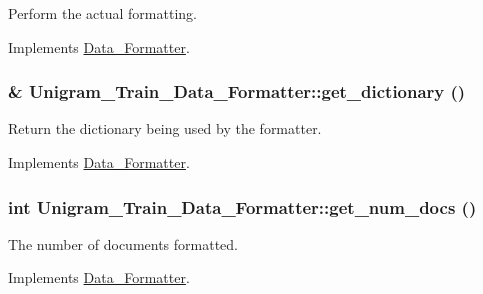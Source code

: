 Perform the actual formatting. 



Implements \hyperlink{class_data___formatter_a4180972aaff1249e0290c3544665403d}{Data\_\-Formatter}.

\hypertarget{class_unigram___train___data___formatter_ab406933ef119074cab682cb07c9078b4}{
\subsubsection[{get\_\-dictionary}]{ \& Unigram\_\-Train\_\-Data\_\-Formatter::get\_\-dictionary ()}}
\label{class_unigram___train___data___formatter_ab406933ef119074cab682cb07c9078b4}


Return the dictionary being used by the formatter. 



Implements \hyperlink{class_data___formatter_ad7371376f95eddd15fb197a729b28c50}{Data\_\-Formatter}.

\hypertarget{class_unigram___train___data___formatter_afbc58721bb9c38bdcd2684ef048b6807}{
\subsubsection[{get\_\-num\_\-docs}]{\setlength{\rightskip}{0pt plus 5cm}int Unigram\_\-Train\_\-Data\_\-Formatter::get\_\-num\_\-docs ()}}
\label{class_unigram___train___data___formatter_afbc58721bb9c38bdcd2684ef048b6807}


The number of documents formatted. 



Implements \hyperlink{class_data___formatter_aec61a89d2fc394ac8f28fb502357c90e}{Data\_\-Formatter}.

